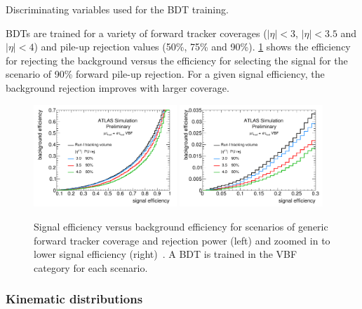 \begin{table}[!htpb]
  \centering
  \renewcommand{\arraystretch}{1.4}
  \caption{Discriminating variables used for the BDT training.}
  
  \label{tab:prospects-hllhc-inputs}
\end{table}

BDTs are trained for a variety of forward tracker coverages ($|\eta| < 3$, $|\eta| < 3.5$ and $|\eta| < 4$) and pile-up rejection values (50\%, 75\% and 90\%). \cref{fig:prospects-hllhc-rocs} shows the efficiency for rejecting the background versus the efficiency for selecting the signal for the scenario of 90\% forward pile-up rejection. For a given signal efficiency, the background rejection improves with larger coverage.

\begin{figure}[!htpb]
  \centering
  \includegraphics[width=0.48\textwidth]{figures/ATL-PHYS-PUB-2014-018/fig_02a}
  \includegraphics[width=0.48\textwidth]{figures/ATL-PHYS-PUB-2014-018/fig_02b}
  \caption{Signal efficiency versus background efficiency for scenarios of generic forward tracker coverage and rejection power (left) and zoomed in to lower signal efficiency (right)~\cite{ATL-PHYS-PUB-2014-018}. A BDT is trained in the VBF category for each scenario.}
  \label{fig:prospects-hllhc-rocs}
\end{figure}

\subsubsection{Kinematic distributions}

